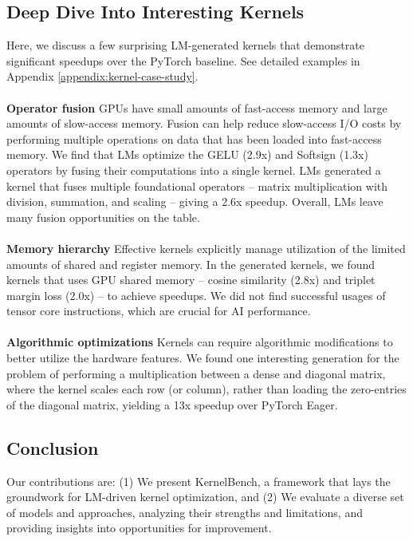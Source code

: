 \label{sec-6:discussion}

\vspace{-2mm}
\subsection{Deep Dive Into Interesting Kernels} \label{section: discussion-interesting-kernel}
Here, we discuss a few surprising LM-generated kernels that demonstrate significant speedups over the PyTorch baseline. See detailed examples in Appendix \ref{appendix:kernel-case-study}.
\\\\
\noindent \textbf{Operator fusion} GPUs have small amounts of fast-access memory and large amounts of slow-access memory. Fusion can help reduce slow-access I/O costs by performing multiple operations on data that has been loaded into fast-access memory.
We find that LMs optimize the GELU (2.9x) and Softsign (1.3x) operators by fusing their computations into a single kernel. LMs generated a kernel that fuses multiple foundational operators -- matrix multiplication with division, summation, and scaling -- giving a 2.6x speedup. Overall, LMs leave  many fusion opportunities on the table.
\\\\
\noindent \textbf{Memory hierarchy} Effective kernels explicitly manage utilization of the limited amounts of shared and register memory. In the generated kernels, we found kernels that uses GPU shared memory -- cosine similarity (2.8x) and triplet margin loss (2.0x) -- to achieve speedups. We did not find successful usages of tensor core instructions, which are crucial for AI performance.
\\\\
\noindent \textbf{Algorithmic optimizations} Kernels can require algorithmic modifications to better utilize the hardware features. We found one interesting generation for the problem of performing a multiplication between a dense and diagonal matrix, where the kernel scales each row (or column), rather than loading the zero-entries of the diagonal matrix, yielding a 13x speedup over PyTorch Eager. 

\subsection{Conclusion}
Our contributions are: (1) We present KernelBench, a framework that lays the groundwork for LM-driven kernel optimization, and (2) We evaluate a diverse set of models and approaches, analyzing their strengths and limitations, and providing insights into opportunities for improvement.

